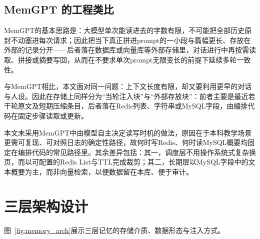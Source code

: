 \documentclass{base}
\begin{document}
\subsection{MemGPT 的工程类比}

MemGPT的基本思路是：大模型单次能读进去的字数有限，不可能把全部历史原封不动塞进每次请求；因此把当下真正拼进prompt的一小段与篇幅更长、存放在外部的记录分开——后者落在数据库或向量库等外部存储里，对话进行中再按需读取、拼接或摘要写回，从而在不要求单次prompt无限变长的前提下延续多轮一致性\cite{MemGPT2023}。

与MemGPT相比，本文面对同一问题：上下文长度有限，却又要利用更早的对话与人设。因此在存储上同样分为``当轮注入块''与``外部存放块''：前者主要是最近若干轮原文及短期压缩条目，后者落在Redis列表、字符串或MySQL字段，由编排代码在固定步骤读取或更新。

本文未采用MemGPT中由模型自主决定读写时机的做法，原因在于本科教学场景更需可复现、可对照日志的确定性路径，故何时写Redis、何时读MySQL概要均固定在编排代码的常见路径里。其余差异包括：其一，调度层不用操作系统式复杂换页，而以可配置的Redis List与TTL完成裁剪；其二，长期层以MySQL字段中的文本概要为主，而非向量检索，以便数据留在本库、便于审计。

\section{三层架构设计}\label{sec:memgptrelation}

图~\ref{fig:memory_arch}展示三层记忆的存储介质、数据形态与注入方式。
\end{document}
